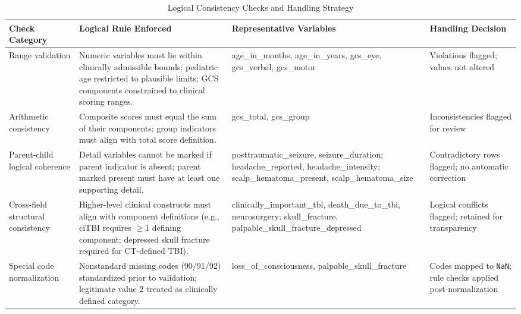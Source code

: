 \documentclass[11pt,letterpaper]{article}
\begin{document}
\begin{table}[ht]
\centering
\footnotesize
\renewcommand{\arraystretch}{1.5}

\caption{Logical Consistency Checks and Handling Strategy}

\begin{tabularx}{\textwidth}{
    >{\raggedright\arraybackslash}p{3.2cm}
    >{\raggedright\arraybackslash}X
    >{\raggedright\arraybackslash}p{3.6cm}
    >{\raggedright\arraybackslash}p{3.2cm}
}
\toprule
\textbf{Check Category} &
\textbf{Logical Rule Enforced} &
\textbf{Representative Variables} &
\textbf{Handling Decision} \\
\midrule

Range validation &
Numeric variables must lie within clinically admissible bounds; pediatric age restricted to plausible limits; GCS components constrained to clinical scoring ranges. &
age\_in\_months, age\_in\_years, gcs\_eye, gcs\_verbal, gcs\_motor &
Violations flagged; values not altered \\

\addlinespace[6pt]

Arithmetic consistency &
Composite scores must equal the sum of their components; group indicators must align with total score definition. &
gcs\_total, gcs\_group &
Inconsistencies flagged for review \\

\addlinespace[6pt]

Parent-child logical coherence &
Detail variables cannot be marked if parent indicator is absent; parent marked present must have at least one supporting detail. &
posttraumatic\_seizure, seizure\_duration; headache\_reported, headache\_intensity; scalp\_hematoma\_present, scalp\_hematoma\_size &
Contradictory rows flagged; no automatic correction \\

\addlinespace[6pt]

Cross-field structural consistency &
Higher-level clinical constructs must align with component definitions (e.g., ciTBI requires $\geq$1 defining component; depressed skull fracture required for CT-defined TBI). &
clinically\_important\_tbi, death\_due\_to\_tbi, neurosurgery; skull\_fracture, palpable\_skull\_fracture\_depressed &
Logical conflicts flagged; retained for transparency \\

\addlinespace[6pt]

Special code normalization &
Nonstandard missing codes (90/91/92) standardized prior to validation; legitimate value 2 treated as clinically defined category. &
loss\_of\_consciousness, palpable\_skull\_fracture &
Codes mapped to \texttt{NaN}; rule checks applied post-normalization \\

\bottomrule
\end{tabularx}
\end{table}
\end{document}
